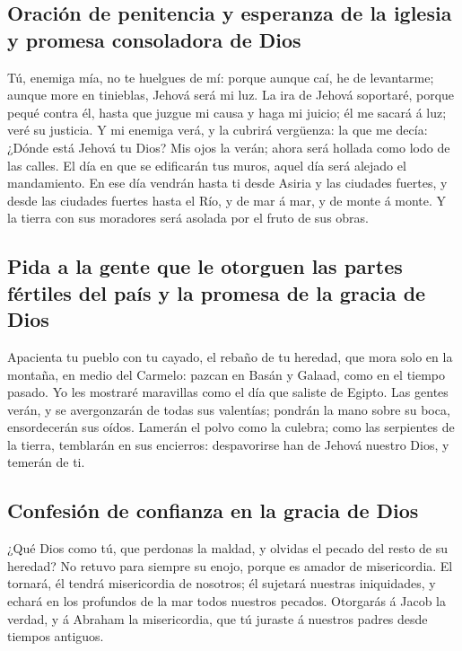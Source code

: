 \hypertarget{oraciuxf3n-de-penitencia-y-esperanza-de-la-iglesia-y-promesa-consoladora-de-dios}{%
\subsection{Oración de penitencia y esperanza de la iglesia y promesa
consoladora de
Dios}\label{oraciuxf3n-de-penitencia-y-esperanza-de-la-iglesia-y-promesa-consoladora-de-dios}}

 Tú, enemiga mía, no te huelgues de mí: porque aunque caí,
he de levantarme; aunque more en tinieblas, Jehová será mi luz.
 La ira de Jehová soportaré, porque pequé contra él, hasta
que juzgue mi causa y haga mi juicio; él me sacará á luz; veré su
justicia.  Y mi enemiga verá, y la cubrirá vergüenza: la
que me decía: ¿Dónde está Jehová tu Dios? Mis ojos la verán; ahora será
hollada como lodo de las calles.  El día en que se
edificarán tus muros, aquel día será alejado el mandamiento.
 En ese día vendrán hasta ti desde Asiria y las ciudades
fuertes, y desde las ciudades fuertes hasta el Río, y de mar á mar, y de
monte á monte.  Y la tierra con sus moradores será
asolada por el fruto de sus obras.

\hypertarget{pida-a-la-gente-que-le-otorguen-las-partes-fuxe9rtiles-del-pauxeds-y-la-promesa-de-la-gracia-de-dios}{%
\subsection{Pida a la gente que le otorguen las partes fértiles del país
y la promesa de la gracia de
Dios}\label{pida-a-la-gente-que-le-otorguen-las-partes-fuxe9rtiles-del-pauxeds-y-la-promesa-de-la-gracia-de-dios}}

 Apacienta tu pueblo con tu cayado, el rebaño de tu
heredad, que mora solo en la montaña, en medio del Carmelo: pazcan en
Basán y Galaad, como en el tiempo pasado.  Yo les
mostraré maravillas como el día que saliste de Egipto. 
Las gentes verán, y se avergonzarán de todas sus valentías; pondrán la
mano sobre su boca, ensordecerán sus oídos.  Lamerán el
polvo como la culebra; como las serpientes de la tierra, temblarán en
sus encierros: despavorirse han de Jehová nuestro Dios, y temerán de ti.

\hypertarget{confesiuxf3n-de-confianza-en-la-gracia-de-dios}{%
\subsection{Confesión de confianza en la gracia de
Dios}\label{confesiuxf3n-de-confianza-en-la-gracia-de-dios}}

 ¿Qué Dios como tú, que perdonas la maldad, y olvidas el
pecado del resto de su heredad? No retuvo para siempre su enojo, porque
es amador de misericordia.  El tornará, él tendrá
misericordia de nosotros; él sujetará nuestras iniquidades, y echará en
los profundos de la mar todos nuestros pecados. 
Otorgarás á Jacob la verdad, y á Abraham la misericordia, que tú juraste
á nuestros padres desde tiempos antiguos.
